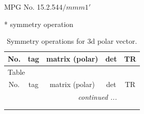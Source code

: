 \documentclass[fleqn,8pt]{jsarticle}
\begin{document}
\setcounter{MaxMatrixCols}{32}

\renewcommand{\tablename}{Table~}
\renewcommand{\figurename}{Figure~}
\begin{center}
\LARGE
MPG No. 15.2.54\quad$4/mmm1'$
\end{center}
* symmetry operation
\renewcommand{\arraystretch}{1.3}
\begin{longtable}{ccccc}
\caption{Symmetry operations for 3d polar vector.}
 \\
 \hline \hline
No. & tag & matrix (polar) & det & TR \\ \hline \endfirsthead

\multicolumn{4}{l}{\tablename\ \thetable{}} \\
 \hline \hline
No. & tag & matrix (polar) & det & TR \\ \hline \endhead

 \hline \hline
\multicolumn{4}{r}{\footnotesize\it continued ...} \\ \endfoot

 \hline \hline
\multicolumn{4}{r}{} \\ \endlastfoot


\end{longtable}
\end{document}
